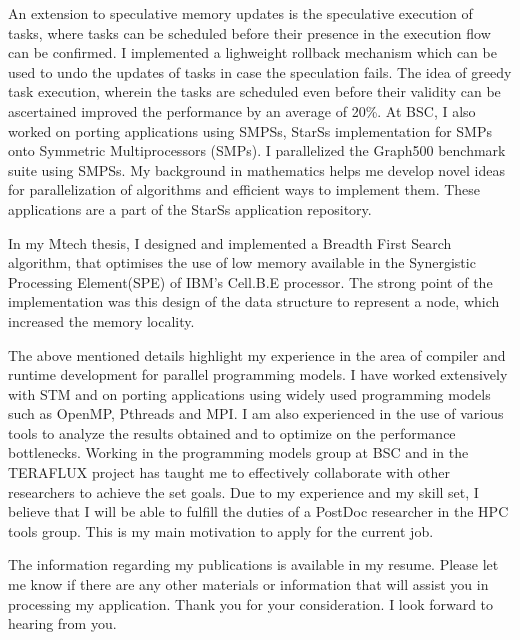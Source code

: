\documentclass[10pt,stdletter,dateno]{newlfm}
\begin{document}
\begin{newlfm}
%
	   \par
	   An extension to speculative memory updates is the speculative execution of tasks, where tasks can be scheduled before their presence in the execution flow can be confirmed.
	   I implemented a lighweight rollback mechanism which can be used to undo the updates of tasks in case the speculation fails.
	   The idea of greedy task execution, wherein the tasks are scheduled even before their validity can be ascertained improved the performance by an average of 20\%. 
	   At BSC, I also worked on porting applications using SMPSs, StarSs implementation for SMPs onto Symmetric Multiprocessors (SMPs).
	   I parallelized the Graph500 benchmark suite using SMPSs.
	   My background in mathematics helps me develop novel ideas for parallelization of algorithms and efficient ways to implement them. 
	   These applications are a part of the StarSs application repository. 
%
	   \par
	   In my Mtech thesis, I designed and implemented a Breadth First Search algorithm, that optimises the use of low memory available in the Synergistic Processing Element(SPE) of IBM's Cell.B.E processor. 
	   The strong point of the implementation was this design of the data structure to represent a node, which increased the memory locality.
%
	   \par
	   The above mentioned details highlight my experience in the area of compiler and runtime development for parallel programming models. 
	   I have worked extensively with STM and on porting applications using widely used programming models such as OpenMP, Pthreads and MPI. 
	   I am also experienced in the use of various tools to analyze the results obtained and to optimize on the performance bottlenecks.
	   Working in the programming models group at BSC and in the TERAFLUX project has taught me to effectively collaborate with other researchers to achieve the set goals.
	   Due to my experience and my skill set, I believe that I will be able to fulfill the duties of a PostDoc researcher in the HPC tools group.
	   This is my main motivation to apply for the current job. 
%
	   \par
	   The information regarding my publications is available in my resume.
	   Please let me know if there are any other materials or information that will assist you in processing my application.
	   Thank you for your consideration. I look forward to hearing from you.
%
\end{newlfm}
\end{document}
